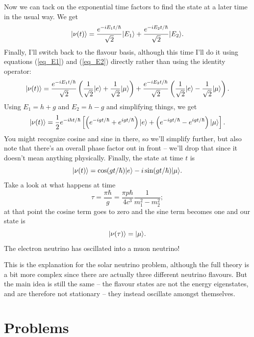 Now we can tack on the exponential time factors to find the state at a later time in the usual way.  We get
\[
| \nu(t) \rangle = \frac{e^{-iE_1 t / \hbar}}{\sqrt{2}} | E_1 \rangle + \frac{e^{-iE_2 t / \hbar}}{\sqrt{2}} | E_2 \rangle.
\]
Finally, I'll switch back to the flavour basis, although this time I'll do it using equations (\ref{eq_E1}) and (\ref{eq_E2}) directly rather than using the identity operator:
\[
| \nu(t) \rangle = \frac{e^{-iE_1 t / \hbar}}{\sqrt{2}} \left( \frac{1}{\sqrt{2}} | e \rangle + \frac{1}{\sqrt{2}} | \mu \rangle \right)  + \frac{e^{-iE_2 t / \hbar}}{\sqrt{2}} \left( \frac{1}{\sqrt{2}} | e \rangle - \frac{1}{\sqrt{2}} | \mu \rangle \right).
\]
Using $E_1 = h + g$ and $E_2 = h -g$ and simplifying things, we get
\[
| \nu(t) \rangle = \frac{1}{2} e^{-iht/\hbar} \left[  \left( e^{-igt/\hbar} + e^{igt/\hbar} \right) | e \rangle +  \left( e^{-igt/\hbar} - e^{igt/\hbar} \right) | \mu \rangle \right].
\]
You might recognize cosine and sine in there, so we'll simplify further, but also note that there's an overall phase factor out in front -- we'll drop that since it doesn't mean anything physically.  Finally, the state at time $t$ is
\begin{equation}
| \nu(t) \rangle = \cos (gt/\hbar) | e \rangle - i \sin(gt/\hbar) | \mu \rangle.
\end{equation}
Take a look at what happens at time
\[
\tau = \frac{\pi \hbar}{g} = \frac{\pi p \hbar}{4c^3} \frac{1}{m_1^2 - m_2^2};
\]
at that point the cosine term goes to zero and the sine term becomes one and our state is
\[
| \nu(\tau) \rangle = | \mu \rangle.
\]
The electron neutrino has oscillated into a muon neutrino!

This is the explanation for the solar neutrino problem, although the full theory is a bit more complex since there are actually three different neutrino flavours.  But the main idea is still the same -- the flavour states are not the energy eigenstates, and are therefore not stationary -- they instead oscillate amongst themselves.



%
%
%

\section*{Problems}
%

